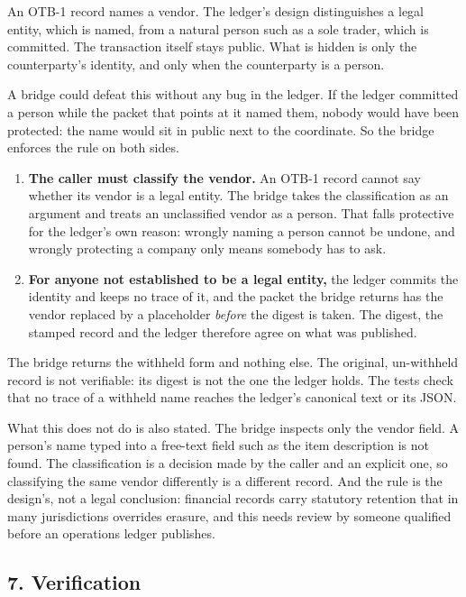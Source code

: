 \documentclass[
  12pt,
  letterpaper,
]{article}
\providecommand{\tightlist}{%
  \setlength{\itemsep}{0pt}\setlength{\parskip}{0pt}}
\begin{document}
An OTB-1 record names a vendor. The ledger's design distinguishes a
legal entity, which is named, from a natural person such as a sole
trader, which is committed. The transaction itself stays public. What is
hidden is only the counterparty's identity, and only when the
counterparty is a person.

A bridge could defeat this without any bug in the ledger. If the ledger
committed a person while the packet that points at it named them, nobody
would have been protected: the name would sit in public next to the
coordinate. So the bridge enforces the rule on both sides.

\begin{enumerate}
\def\labelenumi{\arabic{enumi}.}
\tightlist
\item
  \textbf{The caller must classify the vendor.} An OTB-1 record cannot
  say whether its vendor is a legal entity. The bridge takes the
  classification as an argument and treats an unclassified vendor as a
  person. That falls protective for the ledger's own reason: wrongly
  naming a person cannot be undone, and wrongly protecting a company
  only means somebody has to ask.
\item
  \textbf{For anyone not established to be a legal entity,} the ledger
  commits the identity and keeps no trace of it, and the packet the
  bridge returns has the vendor replaced by a placeholder \emph{before}
  the digest is taken. The digest, the stamped record and the ledger
  therefore agree on what was published.
\end{enumerate}

The bridge returns the withheld form and nothing else. The original,
un-withheld record is not verifiable: its digest is not the one the
ledger holds. The tests check that no trace of a withheld name reaches
the ledger's canonical text or its JSON.

What this does not do is also stated. The bridge inspects only the
vendor field. A person's name typed into a free-text field such as the
item description is not found. The classification is a decision made by
the caller and an explicit one, so classifying the same vendor
differently is a different record. And the rule is the design's, not a
legal conclusion: financial records carry statutory retention that in
many jurisdictions overrides erasure, and this needs review by someone
qualified before an operations ledger publishes.

\hypertarget{verification}{%
\subsection{7. Verification}\label{verification}}
\end{document}
